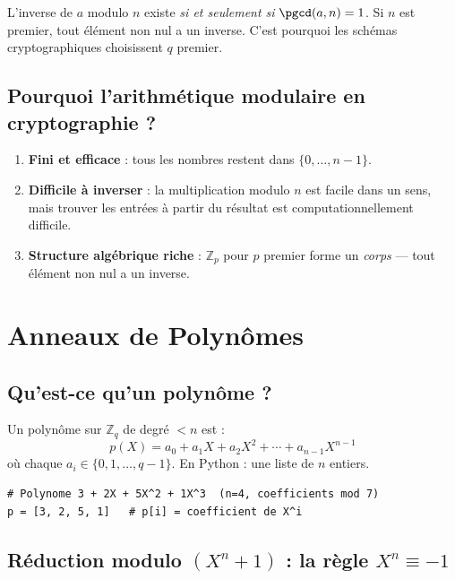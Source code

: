 \documentclass[11pt,a4paper]{article}
\begin{document}
\begin{warningbox}
L'inverse de $a$ modulo $n$ existe \emph{si et seulement si} $\pgcd(a, n) = 1$. Si $n$ est premier, tout élément non nul a un inverse. C'est pourquoi les schémas cryptographiques choisissent $q$ premier.
\end{warningbox}

\subsection{Pourquoi l'arithmétique modulaire en cryptographie ?}

\begin{enumerate}
  \item \textbf{Fini et efficace} : tous les nombres restent dans $\{0, \ldots, n-1\}$.
  \item \textbf{Difficile à inverser} : la multiplication modulo $n$ est facile dans un sens, mais trouver les entrées à partir du résultat est computationnellement difficile.
  \item \textbf{Structure algébrique riche} : $\mathbb{Z}_p$ pour $p$ premier forme un \emph{corps} --- tout élément non nul a un inverse.
\end{enumerate}

\section{Anneaux de Polynômes}

\subsection{Qu'est-ce qu'un polynôme ?}

Un polynôme sur $\mathbb{Z}_q$ de degré $< n$ est :
\[p(X) = a_0 + a_1 X + a_2 X^2 + \cdots + a_{n-1} X^{n-1}\]
où chaque $a_i \in \{0, 1, \ldots, q-1\}$. En Python : une liste de $n$ entiers.

\begin{lstlisting}[style=python]
# Polynome 3 + 2X + 5X^2 + 1X^3  (n=4, coefficients mod 7)
p = [3, 2, 5, 1]   # p[i] = coefficient de X^i
\end{lstlisting}

\subsection{Réduction modulo $(X^n + 1)$ : la règle $X^n \equiv -1$}
\end{document}
